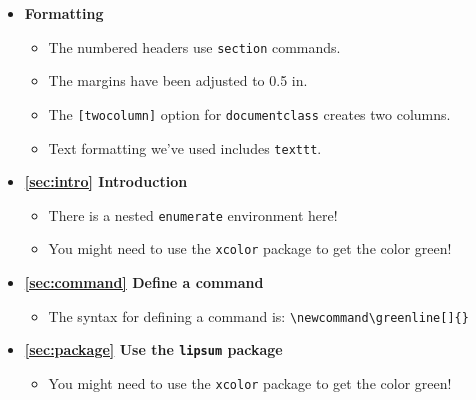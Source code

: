 \documentclass[twocolumn]{article}
\begin{document}
\begin{itemize}
    \item \textbf{Formatting}
    \begin{itemize}
        \item The numbered headers use \texttt{section} commands.
        \item The margins have been adjusted to 0.5 in.
        \item The \texttt{[twocolumn]} option for \texttt{documentclass} creates two columns.
        \item Text formatting we've used includes \texttt{texttt}.
    \end{itemize}
    \item \textbf{\ref{sec:intro} Introduction}
    \begin{itemize}
        \item There is a nested \texttt{enumerate} environment here!
        \item You might need to use the \texttt{xcolor} package to get the color green!
    \end{itemize}
    \item \textbf{\ref{sec:command} Define a command}
    \begin{itemize}
        \item The syntax for defining a command is: \texttt{\textbackslash newcommand\textbackslash greenline[]\{\}}
    \end{itemize}
    \item \textbf{\ref{sec:package} Use the \texttt{lipsum} package}
    \begin{itemize}
        \item You might need to use the \texttt{xcolor} package to get the color green!
    \end{itemize}
\end{itemize}
\end{document}
